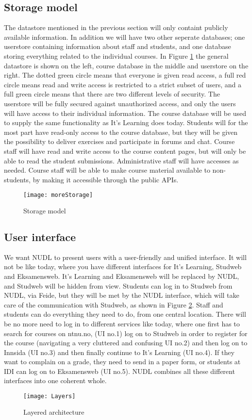 	\subsection{Storage model}
		The datastore mentioned in the previous section will only containt publicly available information. In addition we will have two other seperate databases; one userstore containing information about staff and students, and one database storing everything related to the individual courses. In Figure \ref{fig:storagemodel} the general datastore is shown on the left, course database in the middle and userstore on the right. The dotted green circle means that everyone is given read access, a full red circle means read and write access is restricted to a strict subset of users, and a full green circle means that there are two different levels of security. The userstore will be fully secured against unauthorized access, and only the users will have access to their individual information. The course database will be used to supply the same functionality as It's Learning does today. Students will for the most part have read-only access to the course database, but they will be given the possibility to deliver exercises and participate in forums and chat. Course staff will have read and write access to the course content pages, but will only be able to read the student submissions. Administrative staff will have accesses as needed. 
Course staff will be able to make course material available to non-students, by making it accessible through the public APIs. 
\begin{figure}
\centering
\texttt{[image: moreStorage]}
\caption{Storage model}
\label{fig:storagemodel}
\end{figure}

		
	\subsection{User interface} 
		We want NUDL to present users with a user-friendly and unified interface. It will not be like today, where you have different interfaces for It's Learning, Studweb and Eksamensweb. It's Learning and Eksamensweb will be replaced by NUDL, and Studweb will be hidden from view. Students can log in to Studweb from NUDL, via Feide, but they will be met by the NUDL interface, which will take care of the communication with Studweb, as shown in Figure \ref{fig:layers}. Staff and students can do everything they need to do, from one central location. There will be no more need to log in to different services like today, where one first has to search for courses on ntnu.no, (UI no.1) log on to Studweb in order to register for the course (navigating a very cluttered and confusing UI no.2) and then log on to Innsida (UI no.3) and then finally continue to It's Learning (UI no.4). If they want to complain on a grade, they need to send in a paper form, or students at IDI can log on to Eksamensweb (UI no.5). NUDL combines all these different interfaces into one coherent whole. 
\begin{figure}
\centering
\texttt{[image: Layers]}
\caption{Layered architecture}
\label{fig:layers}
\end{figure}